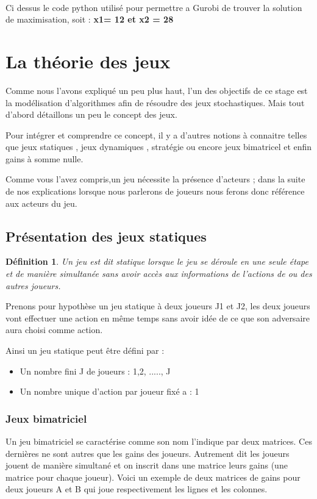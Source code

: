 \documentclass[a4paper, 12pt, twoside]{article}
\newtheorem{definition}{Définition}
\begin{document}
\paragraph*{}{Ci dessus le code python utilisé pour permettre a \textsf{Gurobi} de trouver la solution de maximisation, soit  : \textbf{x1= 12 et x2 = 28}}
\newpage

\section{La théorie des jeux}
Comme nous l'avons expliqué un peu plus haut, l'un des objectifs de ce stage est la modélisation d'algorithmes afin de résoudre des jeux stochastiques. Mais tout d'abord détaillons un peu le concept des \textsf{jeux}. \newline

Pour intégrer et comprendre ce concept, il y a d'autres notions à connaitre telles que \textsf{jeux statiques} , \textsf{jeux dynamiques} , \textsf{stratégie } ou encore \textsf{jeux bimatricel} et enfin \textsf{gains à somme nulle}.\newline

Comme vous l'avez compris,un jeu nécessite la présence d'acteurs ; dans la suite de nos explications lorsque nous parlerons de \textsf{joueurs} nous ferons donc référence aux acteurs du jeu.

\subsection{Présentation des jeux statiques}
\begin{definition}
Un jeu est dit statique lorsque le jeu se déroule en une seule étape et de manière simultanée sans avoir accès aux informations de l'actions de ou des autres joueurs.
\end{definition} 
Prenons pour hypothèse un jeu statique à deux joueurs J1 et J2, les deux joueurs vont effectuer une action en même temps sans avoir idée de ce que son adversaire aura choisi comme action. \newline

Ainsi un \textsf{jeu statique} peut être défini par : 
\begin{itemize}
\item Un nombre fini J de joueurs : {1,2, ....., J}
\item Un nombre unique d'action par joueur fixé a : 1 
\end{itemize}

\subsubsection{Jeux bimatriciel}
Un jeu bimatriciel se caractérise comme son nom l'indique par deux matrices. Ces dernières ne sont autres que les gains des joueurs. Autrement dit les joueurs jouent de manière simultané et on inscrit dans une matrice leurs gains (une matrice pour chaque joueur). Voici un exemple de deux matrices de gains pour deux joueurs A et B qui joue respectivement les lignes et les colonnes.
\end{document}
